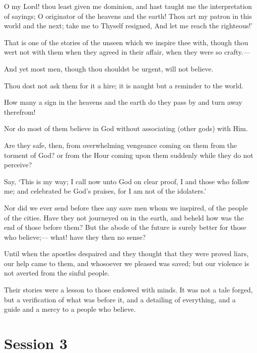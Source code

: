 \documentclass[fontsize=14pt, letterpaper, notitlepage, openany, DIV=12]{scrbook} %
\begin{document}
\noindent[12:101]
O my Lord! thou least given me dominion, and hast taught me the interpretation of
sayings; O originator of the heavens and the earth! Thou art my patron in this world and the next;
take me to Thyself resigned, And let me reach the righteous!'

\noindent[12:102]
That is one of the stories of the unseen which we inspire thee with, though thou wert not
with them when they agreed in their affair, when they were so crafty.---

\noindent[12:103]
And yet most men, though thou shouldst be urgent, will not believe.

\noindent[12:104]
Thou dost not ask them for it a hire; it is naught but a reminder to the world.

\noindent[12:105]
How many a sign in the heavens and the earth do they pass by and turn away therefrom!

\noindent[12:106]
Nor do most of them believe in God without associating (other gods) with Him.

\noindent[12:107]
Are they safe, then, from overwhelming vengeance coming on them from the torment of
God? or from the Hour coming upon them suddenly while they do not perceive?

\noindent[12:108]
Say, `This is my way; I call now unto God on clear proof, I and those who follow me;
and celebrated be God's praises, for I am not of the idolaters.'

\noindent[12:109]
Nor did we ever send before thee any save men whom we inspired, of the people of the
cities. Have they not journeyed on in the earth, and beheld how was the end of those before
them? But the abode of the future is surely better for those who believe;--- what! have they then
no sense?

\noindent[12:110]
Until when the apostles despaired and they thought that they were proved liars, our help
came to them, and whosoever we pleased was saved; but our violence is not averted from the
sinful people.

\noindent[12:111]
Their stories were a lesson to those endowed with minds. It was not a tale forged, but a
verification of what was before it, and a detailing of everything, and a guide and a mercy to a
people who believe.

\clearpage
\chapter{Session 3}


\end{document}
